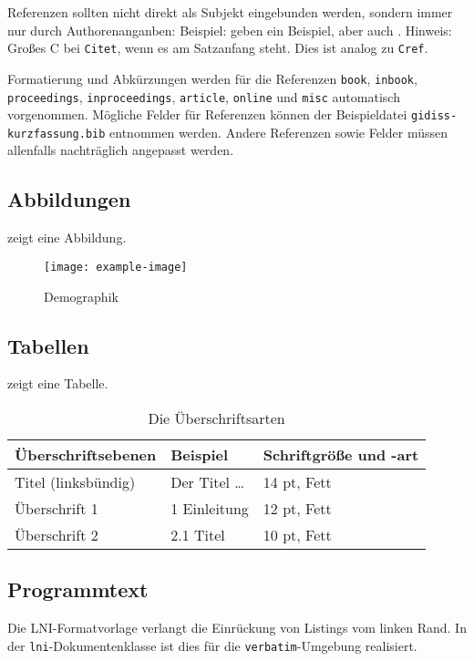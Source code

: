 \documentclass[draft,utf8,biblatex,norunningheads]{lni}
\begin{document}
Referenzen sollten nicht direkt als Subjekt eingebunden werden, sondern immer nur durch Authorenanganben:
Beispiel:  geben ein Beispiel, aber auch \citet{Az09}.
Hinweis: Großes C bei \texttt{Citet}, wenn es am Satzanfang steht. Dies ist analog zu \texttt{Cref}.

Formatierung und Abkürzungen werden für die Referenzen \texttt{book}, \texttt{inbook}, \texttt{proceedings}, \texttt{inproceedings}, \texttt{article}, \texttt{online} und \texttt{misc} automatisch vorgenommen.
Mögliche Felder für Referenzen können der Beispieldatei \texttt{gidiss-kurzfassung.bib} entnommen werden.
Andere Referenzen sowie Felder müssen allenfalls nachträglich angepasst werden.

\subsection{Abbildungen}
 zeigt eine Abbildung.

\begin{figure}
  \centering
  \texttt{[image: example-image]}
  \caption{Demographik}
  \label{fig:demo}
\end{figure}

\subsection{Tabellen}
 zeigt eine Tabelle.

\begin{table}
\centering
\begin{tabular}{lll}
\toprule
Überschriftsebenen & Beispiel & Schriftgröße und -art \\
\midrule
Titel (linksbündig) & Der Titel \ldots & 14 pt, Fett\\
Überschrift 1 & 1 Einleitung & 12 pt, Fett\\
Überschrift 2 & 2.1 Titel & 10 pt, Fett\\
\bottomrule
\end{tabular}
\caption{Die Überschriftsarten}
\label{tab:demo}
\end{table}

\subsection{Programmtext}
Die LNI-Formatvorlage verlangt die Einrückung von Listings vom linken Rand.
In der \texttt{lni}-Dokumentenklasse ist dies für die \texttt{verbatim}-Umgebung realisiert.
\end{document}
